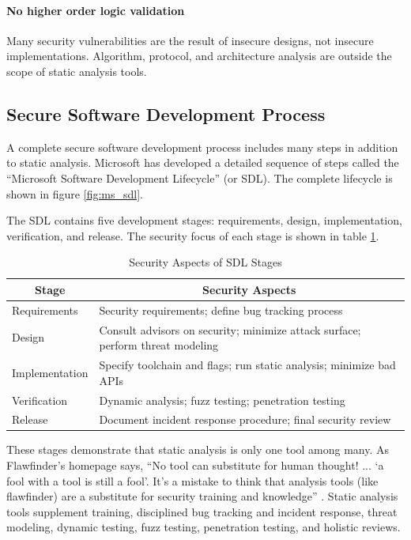 \documentclass[journal]{IEEEtran}
\newcommand*{\thead}[1]{\multicolumn{1}{c}{\bfseries #1}}
\begin{document}
\paragraph{No higher order logic validation} Many security vulnerabilities are the result of
insecure designs, not insecure implementations. Algorithm, protocol, and architecture analysis are
outside the scope of static analysis tools.

\subsection{Secure Software Development Process}

A complete secure software development process includes many steps in addition to static analysis.
Microsoft has developed a detailed sequence of steps called the ``Microsoft Software Development
Lifecycle'' (or SDL). The complete lifecycle is shown in figure \ref{fig:ms_sdl}.

The SDL contains five development stages: requirements, design, implementation, verification, and
release. The security focus of each stage is shown in table \ref{table:sdl_security}.

\begin{table}[h]
    \centering
    \begin{tabular}{|l|p{}|}
        \hline
        \thead{Stage} & \thead{Security Aspects} \\ \hline
        Requirements &
            Security requirements; define bug tracking process
            \\ \hline
        Design &
            Consult advisors on security; minimize attack surface; perform threat modeling
            \\ \hline
        Implementation &
            Specify toolchain and flags; run static analysis; minimize bad APIs
            \\ \hline
        Verification &
            Dynamic analysis; fuzz testing; penetration testing
            \\ \hline
        Release &
            Document incident response procedure; final security review
            \\ \hline
    \end{tabular}
    \caption{Security Aspects of SDL Stages}
    \label{table:sdl_security}
\end{table}

These stages demonstrate that static analysis is only one tool among many. As Flawfinder's homepage
says, ``No tool can substitute for human thought! ... `a fool with a tool is still a fool'. It’s a
mistake to think that analysis tools (like flawfinder) are a substitute for security training and
knowledge'' \cite{flawfinder}. Static analysis tools supplement training, disciplined bug tracking
and incident response, threat modeling, dynamic testing, fuzz testing, penetration testing, and
holistic reviews.
\end{document}
